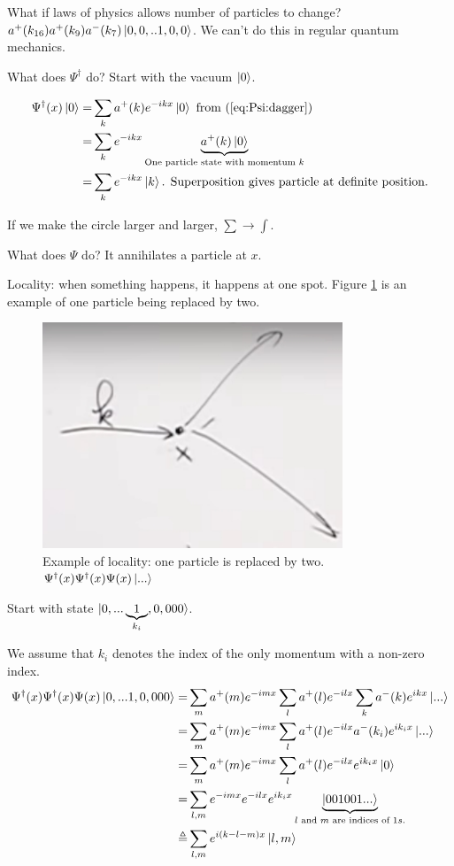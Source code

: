 \documentclass[]{article}
\begin{document}
What if laws of physics allows number of particles to change? $a^+(k_{16})a^+(k_9)a^-(k_7)\ket{0,0,..1,0,0}$. We can't do this in regular quantum mechanics.

What does $\Psi^\dagger$ do? Start with the vacuum $\ket{0}$.

\begin{align*}
\Psi^\dagger(x)\ket{0} =& \sum_k a^+(k) e^{-ikx} \ket{0} \text{ from (\ref{eq:Psi:dagger})}\\
=& \sum_k e^{-ikx} \underbrace{a^+(k) \ket{0}}_\text{One particle state with momentum $k$} \\
=& \sum_k e^{-ikx} \ket{k} \text{. Superposition gives particle at definite position.}
\end{align*}

If we make the circle larger and larger, $\sum \rightarrow \int$.

What does $\Psi$ do? It annihilates a particle at $x$.

Locality: when something happens, it happens at one spot. Figure \ref{fig:ex:locality} is an example of one particle being replaced by two.

\begin{figure}[H]
	\caption[Example of locality: one particle is replaced by two]{Example of locality: one particle is replaced by two. $\Psi^\dagger(x)\Psi^\dagger(x)\Psi(x)\ket{...}$}\label{fig:ex:locality}
	\includegraphics[width=0.8\textwidth]{split-particle}
\end{figure}

Start with state $\ket{0,...\underbrace{1}_\text{$k_i$},0,000}$.

We assume that $k_i$ denotes the index of the only momentum with a non-zero index.
\begin{align*}
\Psi^\dagger(x)\Psi^\dagger(x)\Psi(x)\ket{0,...1,0,000}=&\sum_m a^+(m) e^{-imx} \sum_l a^+(l) e^{-ilx} \sum_k a^-(k) e^{ikx} \ket{...}\\
=&\sum_m a^+(m) e^{-imx} \sum_l a^+(l) e^{-ilx} a^-(k_i) e^{ik_ix} \ket{...}\\
=&\sum_m a^+(m) e^{-imx} \sum_l a^+(l) e^{-ilx}  e^{ik_ix} \ket{0}\\
=&\sum_{l,m}  e^{-imx}  e^{-ilx}  e^{ik_ix} \underbrace{\ket{001001...}}_\text{$l$ and $m$ are indices of $1s$.}\\
\triangleq &\sum_{l,m}   e^{i(k-l-m)x} \ket{l,m}
\end{align*}
\end{document}
